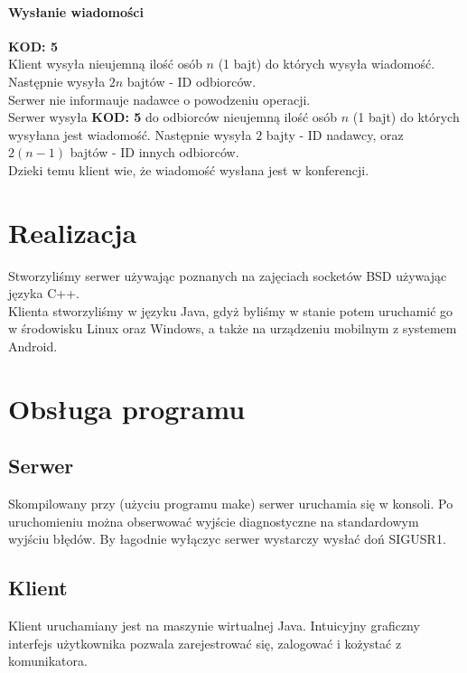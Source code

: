 \documentclass[10pt,a4paper]{article}
\newcommand{\kod}[1]{\textbf{\small{KOD: #1}}}
\begin{document}
	\paragraph{Wysłanie wiadomości}\kod{5}\\
		Klient wysyła nieujemną ilość osób $n$ (1 bajt) do których wysyła wiadomość. Następnie wysyła $2n$ bajtów -
		ID odbiorców.\\
		Serwer nie informauje nadawce o powodzeniu operacji.\\
		Serwer wysyła \kod{5} do odbiorców nieujemną ilość osób $n$ (1 bajt) do których wysyłana jest wiadomość.
		Następnie wysyła $2$ bajty - ID nadawcy, oraz $2(n-1)$ bajtów - ID innych odbiorców.\\
		Dzieki temu klient wie, że wiadomość wysłana jest w konferencji.
\section{Realizacja}
	Stworzyliśmy serwer używając poznanych na zajęciach socketów BSD używając języka C++.\\
	Klienta stworzyliśmy w języku Java, gdyż byliśmy w stanie potem uruchamić go w środowisku
	Linux oraz Windows, a także na urządzeniu mobilnym z systemem Android.
\section{Obsługa programu}
	\subsection{Serwer}
		Skompilowany przy (użyciu programu make) serwer uruchamia się w konsoli.
		Po uruchomieniu można obserwować wyjście diagnostyczne na standardowym wyjściu błędów.
		By łagodnie wyłączyc serwer wystarczy wysłać doń SIGUSR1.
	\subsection{Klient}
		Klient uruchamiany jest na maszynie wirtualnej Java.
		Intuicyjny graficzny interfejs użytkownika pozwala zarejestrować się, zalogować i kożystać z komunikatora.
\end{document}

